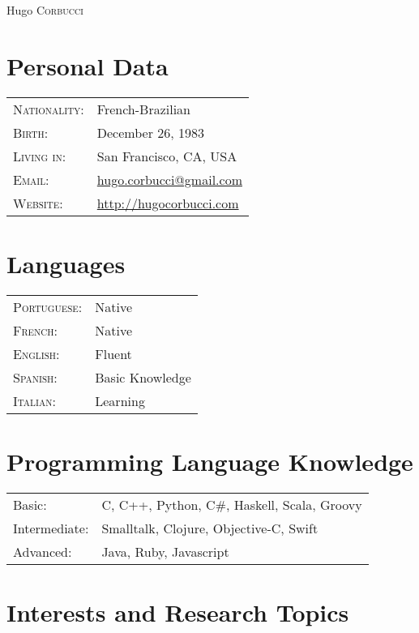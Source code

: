 \documentclass[letter,10pt]{article}
\begin{document}
\par{\centering
		{\Huge Hugo \textsc{Corbucci}
	}\bigskip\par}

      \section{Personal Data}

\begin{tabular}{p{2.5cm}l}
  \textsc{Nationality:} & French-Brazilian
  \\
  \textsc{Birth:} & December 26, 1983 \\
  \textsc{Living in:}   & San Francisco, CA, USA \\
  \textsc{Email:}     &
  \href{mailto:hugo.corbucci@gmail.com}{hugo.corbucci@gmail.com}\\
  \textsc{Website:}     & \href{http://hugocorbucci.com}{http://hugocorbucci.com}
\end{tabular}

\section{Languages}
\begin{tabular}{p{2.5cm}l}
 \textsc{Portuguese:}&Native\\
 \textsc{French:}&Native\\
 \textsc{English:}&Fluent\\
 \textsc{Spanish:}&Basic Knowledge\\
 \textsc{Italian:}&Learning\\
\end{tabular}

\section{Programming Language Knowledge}
\begin{tabular}{p{2.5cm}l}
 Basic:& C, C++, Python, C\#, Haskell, Scala, Groovy\\
 Intermediate:& Smalltalk, Clojure, Objective-C, Swift\\
 Advanced:& Java, Ruby, Javascript\\
\end{tabular}

\section{Interests and Research Topics}
\end{document}
